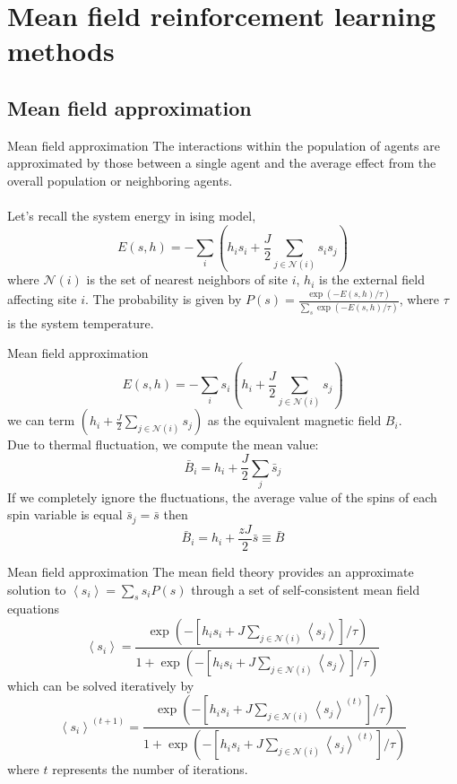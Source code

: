 \section{Mean field reinforcement learning methods}

\subsection{Mean field approximation}

\begin{frame}{Mean field approximation}
	The interactions within the population of agents are
	approximated by those between a single agent
	and \alert{the average effect} from the overall population
	or neighboring agents.
	\
	\newline\\
	
	\pause
	\cite[pp.~74--75]{Ising model}\\
	Let's recall the system energy in ising model,
	$$E(s, h)=-\sum_{i}\left(h_{i} s_{i}+\frac{J}{2} \sum_{j \in \mathcal{N}(i)} s_{i} s_{j}\right)$$
	where $\mathcal{N}(i)$ is the set of nearest neighbors of site $i$, $h_i$ is the external field affecting site $i$. The probability is given by $P(s)=\frac{\exp (-E(s, h) / \tau)}{\sum_{s} \exp (-E(s, h) / \tau)}$, where $\tau$ is the system temperature.
	
\end{frame}

\begin{frame}{Mean field approximation}
	$$E(s, h)=-\sum_{i}s_{i}\left(h_{i}+\frac{J}{2} \sum_{j \in \mathcal{N}(i)} s_{j}\right)$$
	we can term $\left(h_{i}+\frac{J}{2} \sum_{j \in \mathcal{N}(i)} s_{j}\right)$ as the equivalent magnetic field $B_i$.\\
	
	Due to thermal fluctuation, we compute the mean value:
	$$\bar{B}_{i}=h_i+\frac{J}{2} \sum_{j} \bar{s}_{j}$$
	If we completely ignore the fluctuations, the average value of the spins of each spin variable is equal $\bar{s}_{j}=\bar{s}$
	then
	$$\bar{B}_{i}=h_i+\frac{z J}{2} \bar{s} \equiv \bar{B}$$
	
	
\end{frame}

\begin{frame}{Mean field approximation}
	The mean field theory provides an approximate solution to $\left\langle s_{i}\right\rangle=\sum_{s} s_{i} P(s)$ through a set of self-consistent mean field
	equations
	$$\left\langle s_{i}\right\rangle=\frac{\exp \left(-\left[h_{i} s_{i}+J \sum_{j \in \mathcal{N}(i)}\left\langle s_{j}\right\rangle\right] / \tau\right)}{1+\exp \left(-\left[h_{i} s_{i}+J \sum_{j \in \mathcal{N}(i)}\left\langle s_{j}\right\rangle\right] / \tau\right)}$$
	which can be solved iteratively by
	$$\left\langle s_{i}\right\rangle ^{(t+1)}=\frac{\exp \left(-\left[h_{i} s_{i}+J \sum_{j \in \mathcal{N}(i)}\left\langle s_{j}\right\rangle ^{(t)}\right] / \tau\right)}{1+\exp \left(-\left[h_{i} s_{i}+J \sum_{j \in \mathcal{N}(i)}\left\langle s_{j}\right\rangle ^{(t)}\right] / \tau\right)}$$
	where $t$ represents the number of iterations.	
\end{frame}

